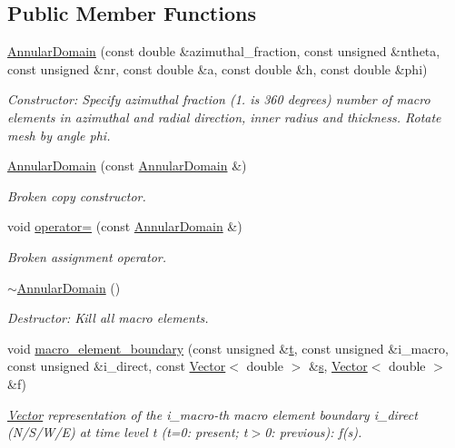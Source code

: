 \subsection*{Public Member Functions}
\begin{DoxyCompactItemize}
\item 
\hyperlink{classoomph_1_1AnnularDomain_aa0b4ad9d8e63de8aa0dc2d462a016143}{Annular\+Domain} (const double \&azimuthal\+\_\+fraction, const unsigned \&ntheta, const unsigned \&nr, const double \&a, const double \&h, const double \&phi)
\begin{DoxyCompactList}\small\item\em Constructor\+: Specify azimuthal fraction (1. is 360 degrees) number of macro elements in azimuthal and radial direction, inner radius and thickness. Rotate mesh by angle phi. \end{DoxyCompactList}\item 
\hyperlink{classoomph_1_1AnnularDomain_ad081791409dc419594d0a64e1c17fb09}{Annular\+Domain} (const \hyperlink{classoomph_1_1AnnularDomain}{Annular\+Domain} \&)
\begin{DoxyCompactList}\small\item\em Broken copy constructor. \end{DoxyCompactList}\item 
void \hyperlink{classoomph_1_1AnnularDomain_a1e66e1208af0b6d0ec4a7006a77dbb5f}{operator=} (const \hyperlink{classoomph_1_1AnnularDomain}{Annular\+Domain} \&)
\begin{DoxyCompactList}\small\item\em Broken assignment operator. \end{DoxyCompactList}\item 
\hyperlink{classoomph_1_1AnnularDomain_a99ee51c9e5fd12fdd123ede8da09c483}{$\sim$\+Annular\+Domain} ()
\begin{DoxyCompactList}\small\item\em Destructor\+: Kill all macro elements. \end{DoxyCompactList}\item 
void \hyperlink{classoomph_1_1AnnularDomain_ade8cfa0e6f2d41e7d3877250321bfff3}{macro\+\_\+element\+\_\+boundary} (const unsigned \&\hyperlink{cfortran_8h_af6f0bd3dc13317f895c91323c25c2b8f}{t}, const unsigned \&i\+\_\+macro, const unsigned \&i\+\_\+direct, const \hyperlink{classoomph_1_1Vector}{Vector}$<$ double $>$ \&\hyperlink{cfortran_8h_ab7123126e4885ef647dd9c6e3807a21c}{s}, \hyperlink{classoomph_1_1Vector}{Vector}$<$ double $>$ \&f)
\begin{DoxyCompactList}\small\item\em \hyperlink{classoomph_1_1Vector}{Vector} representation of the i\+\_\+macro-\/th macro element boundary i\+\_\+direct (N/\+S/\+W/E) at time level t (t=0\+: present; t$>$0\+: previous)\+: f(s). \end{DoxyCompactList}\end{DoxyCompactItemize}
